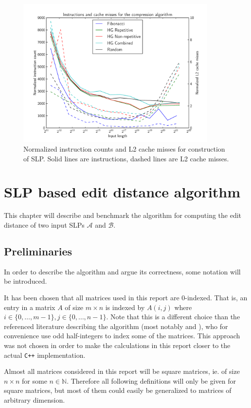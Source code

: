 \documentclass[twoside,11pt,openright]{report}
\newcommand{\SLP}[1] {\mathcal{#1}}
\begin{document}
\begin{figure}[!htb]
  \centering
  \includegraphics[width=10cm]{compression/instructions}
  \caption{Normalized instruction counts and L2 cache misses for construction of SLP. Solid lines are instructions, dashed lines are L2 cache misses.}
  \label{fig:compression:instructions}
\end{figure}

\chapter{SLP based edit distance algorithm}
\label{ch:algorithm}

This chapter will describe and benchmark the algorithm for computing the edit distance of two input SLPs $\SLP{A}$ and $\SLP{B}$.

\section{Preliminaries}
\label{sec:algorithm:preliminaries}
In order to describe the algorithm and argue its correctness, some notation will be introduced.

It has been chosen that all matrices used in this report are $0$-indexed. That is, an entry in a matrix $A$ of size $m \times n$ is indexed by $A(i, j)$ where $i \in \{0, \dots, m - 1\}, j \in \{0, \dots, n - 1\}$. Note that this is a different choice than the referenced literature describing the algorithm (most notably \cite{Tiskin:2010:FDM:1873601.1873704} and \cite{DBLP:journals/corr/abs-0707-3619}), who for convenience use odd half-integers to index some of the matrices. This approach was not chosen in order to make the calculations in this report closer to the actual \texttt{C++} implementation.

Almost all matrices considered in this report will be square matrices, ie. of size $n \times n$ for some $n \in \mathbb{N}$. Therefore all following definitions will only be given for square matrices, but most of them could easily be generalized to matrices of arbitrary dimension.
\end{document}
